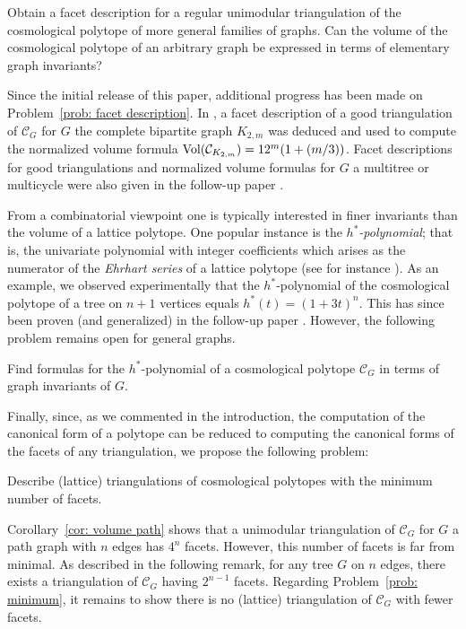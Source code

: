 \begin{problem}
    \label{prob: facet description}
    Obtain a facet description for a regular unimodular triangulation of the cosmological polytope of more general families of graphs. Can the volume of the cosmological polytope of an arbitrary graph be expressed in terms of elementary graph invariants?
\end{problem}

Since the initial release of this paper, additional progress has been made on Problem~\ref{prob: facet description}.  
In \cite{landin2023cosmological}, a facet description of a good triangulation of $\mathcal{C}_G$ for $G$ the complete bipartite graph $K_{2,m}$ was deduced and used to compute the normalized volume formula $\textnormal{Vol}(\mathcal{C}_{K_{2,m}})=12^m(1 + (m/3))$. 
Facet descriptions for good triangulations and normalized volume formulas for $G$ a multitree or multicycle were also given in the follow-up paper \cite{bruckamp2024ehrhart}. 

From a combinatorial viewpoint one is typically interested in finer invariants than the volume of a lattice polytope. 
One popular instance is the \emph{$h^*$-polynomial}; that is, the  univariate polynomial with integer coefficients which arises as the numerator of the \emph{Ehrhart series} of a lattice polytope (see for instance \cite[Chapter 3]{ccd}). 
As an example, we observed experimentally that the $h^*$-polynomial of the cosmological polytope of a tree on $n+1$ vertices equals $h^*(t)=(1+3t)^n$.
This has since been proven (and generalized) in the follow-up paper \cite{bruckamp2024ehrhart}.
However, the following problem remains open for general graphs.

\begin{problem}
	Find formulas for the $h^*$-polynomial of a cosmological polytope $\mathcal{C}_G$ in terms of graph invariants of $G$.
\end{problem}

Finally, since, as we commented in the introduction, the computation of the canonical form of a polytope can be reduced to computing the canonical forms of the facets of any triangulation, we propose the following problem:

\begin{problem}
    \label{prob: minimum}
	Describe (lattice) triangulations of cosmological polytopes with the minimum number of facets.
\end{problem}

Corollary~\ref{cor: volume path} shows that a unimodular triangulation of $\mathcal{C}_{G}$ for $G$ a path graph with $n$ edges has $4^n$ facets.  
However, this number of facets is far from minimal.  
As described in the following remark, for any tree $G$ on $n$ edges, there exists a triangulation of $\mathcal{C}_G$ having $2^{n-1}$ facets. 
Regarding Problem~\ref{prob: minimum}, it remains to show there is no (lattice) triangulation of $\mathcal{C}_G$ with fewer facets. 

